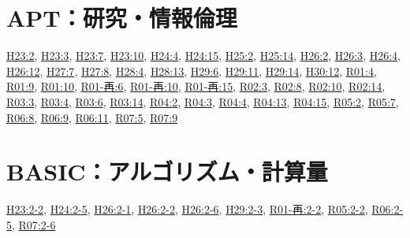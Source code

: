 \section{APT：研究・情報倫理}
\hyperref[q:h23-reg-apt-02]{H23:2}, \hyperref[q:h23-reg-apt-03]{H23:3}, \hyperref[q:h23-reg-apt-07]{H23:7}, \hyperref[q:h23-reg-apt-10]{H23:10}, \hyperref[q:h24-reg-apt-04]{H24:4}, \hyperref[q:h24-reg-apt-15]{H24:15}, \hyperref[q:h25-reg-apt-02]{H25:2}, \hyperref[q:h25-reg-apt-14]{H25:14}, \hyperref[q:h26-reg-apt-02]{H26:2}, \hyperref[q:h26-reg-apt-03]{H26:3}, \hyperref[q:h26-reg-apt-04]{H26:4}, \hyperref[q:h26-reg-apt-12]{H26:12}, \hyperref[q:h27-reg-apt-07]{H27:7}, \hyperref[q:h27-reg-apt-08]{H27:8}, \hyperref[q:h28-reg-apt-04]{H28:4}, \hyperref[q:h28-reg-apt-13]{H28:13}, \hyperref[q:h29-reg-apt-06]{H29:6}, \hyperref[q:h29-reg-apt-11]{H29:11}, \hyperref[q:h29-reg-apt-14]{H29:14}, \hyperref[q:h30-reg-apt-12]{H30:12}, \hyperref[q:r01-reg-apt-04]{R01:4}, \hyperref[q:r01-reg-apt-09]{R01:9}, \hyperref[q:r01-reg-apt-10]{R01:10}, \hyperref[q:r01-ret-apt-06]{R01-再:6}, \hyperref[q:r01-ret-apt-10]{R01-再:10}, \hyperref[q:r01-ret-apt-15]{R01-再:15}, \hyperref[q:r02-reg-apt-03]{R02:3}, \hyperref[q:r02-reg-apt-08]{R02:8}, \hyperref[q:r02-reg-apt-10]{R02:10}, \hyperref[q:r02-reg-apt-14]{R02:14}, \hyperref[q:r03-reg-apt-03]{R03:3}, \hyperref[q:r03-reg-apt-04]{R03:4}, \hyperref[q:r03-reg-apt-06]{R03:6}, \hyperref[q:r03-reg-apt-14]{R03:14}, \hyperref[q:r04-reg-apt-02]{R04:2}, \hyperref[q:r04-reg-apt-03]{R04:3}, \hyperref[q:r04-reg-apt-04]{R04:4}, \hyperref[q:r04-reg-apt-13]{R04:13}, \hyperref[q:r04-reg-apt-15]{R04:15}, \hyperref[q:r05-reg-apt-02]{R05:2}, \hyperref[q:r05-reg-apt-07]{R05:7}, \hyperref[q:r06-reg-apt-08]{R06:8}, \hyperref[q:r06-reg-apt-09]{R06:9}, \hyperref[q:r06-reg-apt-11]{R06:11}, \hyperref[q:r07-reg-apt-05]{R07:5}, \hyperref[q:r07-reg-apt-09]{R07:9}
\section{BASIC：アルゴリズム・計算量}
\hyperref[q:h23-reg-basic-2-2]{H23:2-2}, \hyperref[q:h24-reg-basic-2-5]{H24:2-5}, \hyperref[q:h26-reg-basic-2-1]{H26:2-1}, \hyperref[q:h26-reg-basic-2-2]{H26:2-2}, \hyperref[q:h26-reg-basic-2-6]{H26:2-6}, \hyperref[q:h29-reg-basic-2-3]{H29:2-3}, \hyperref[q:r01-ret-basic-2-2]{R01-再:2-2}, \hyperref[q:r05-reg-basic-2-2]{R05:2-2}, \hyperref[q:r06-reg-basic-2-5]{R06:2-5}, \hyperref[q:r07-reg-basic-2-6]{R07:2-6}
